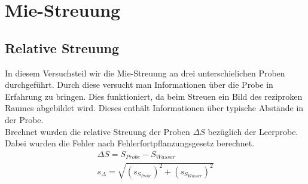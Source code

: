 

\section{Mie-Streuung}

\subsection*{Relative Streuung}

In diesem Versuchsteil wir die Mie-Streuung an drei unterschielichen Proben durchgeführt. Durch diese versucht man Informationen über die 
Probe in Erfahrung zu bringen. Dies funktioniert, da beim Streuen ein Bild des reziproken Raumes abgebildet wird. Dieses enthält Informationen über 
typische Abstände in der Probe. \\
Brechnet wurden die relative Streuung der Proben $\Delta S$ bezüglich der Leerprobe. Dabei wurden die Fehler nach Fehlerfortpflanzungsgesetz berechnet.
\begin{gather}
    \Delta S = S_{Probe}- S_{Wasser}\\
    s_{\Delta} = \sqrt{(s_{S_{Probe}})^2+(s_{S_{Wasser}})^2}
\end{gather}


